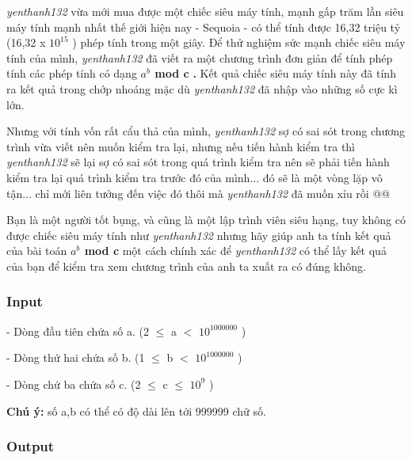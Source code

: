 



\emph{      yenthanh132     }     vừa mới mua được một chiếc siêu máy tính, mạnh gấp trăm lần siêu máy tính mạnh nhất thế giới hiện nay - Sequoia - có thể tính được 16,32 triệu tỷ (16,32 x $10^{15}$     ) phép tính trong một giây. Để thử nghiệm sức mạnh chiếc siêu máy tính của mình,    \emph{      yenthanh132     }     đã viết ra một chương trình đơn giản để tính phép tính các phép tính có dạng    \textbf{      $a^{b}$      mod c     }\textbf{      .     }\textbf{}     Kết quả chiếc siêu máy tính này đã tính ra kết quả trong chớp nhoáng mặc dù    \emph{      yenthanh132     }     đã nhập vào những số cực kì lớn.    



     Nhưng với tính vốn rất cẩu thả của mình,    \emph{      yenthanh132     }     sợ có sai sót trong chương trình vừa viết nên muốn kiểm tra lại, nhưng nếu tiến hành kiểm tra thì    \emph{      yenthanh132     }     sẽ lại sợ có sai sót trong quá trình kiểm tra nên sẽ phải tiến hành kiểm tra lại quá trình kiểm tra trước đó của mình... đó sẽ là một vòng lặp vô tận... chỉ mới liên tưởng đến việc đó thôi mà    \emph{      yenthanh132     }     đã muốn xỉu rồi @@    



     Bạn là một người tốt bụng, và cũng là một lập trình viên siêu hạng, tuy không có được chiếc siêu máy tính như    \emph{      yenthanh132     }     nhưng hãy giúp anh ta tính kết quả của bài toán    \textbf{      $a^{b}$      mod c     }     một cách chính xác để    \emph{      yenthanh132     }     có thể lấy kết quả của bạn để kiểm tra xem chương trình của anh ta xuất ra có đúng không.    

\subsubsection{   Input  }

    - Dòng đầu tiên chứa số a. (2  $\le$  a $<$ $10^{1000000}$    )   



    - Dòng thứ hai chứa số b. (1  $\le$  b $<$ $10^{1000000}$    )   



    - Dòng chứ ba chứa số c. (2 $\le$ c $\le$ $10^{9}$    )   



\textbf{     Chú ý:    }    số a,b có thể có độ dài lên tới 999999 chữ số.   

\subsubsection{   Output  }

